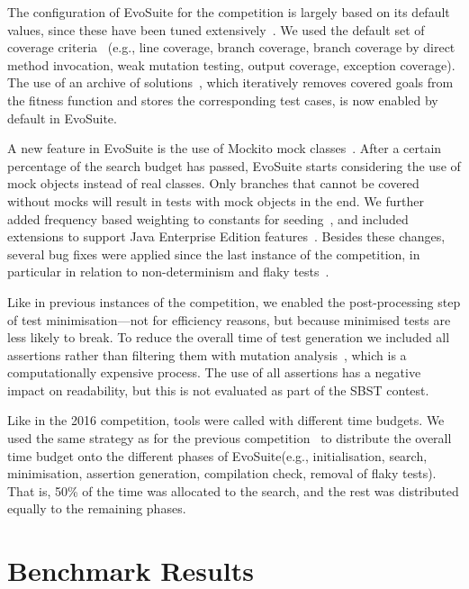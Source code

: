 \documentclass[10pt,conference]{IEEEtran}
\newcommand{\EVOSUITE}{{\sc EvoSuite}\xspace}
\begin{document}
The configuration of \EVOSUITE for the competition is largely based on
its default values, since these have been tuned
extensively~\cite{arcuri2013parameter}. We used the default set of
coverage criteria~\cite{rojas2015combining} (e.g., line coverage,
branch coverage, branch coverage by direct method invocation, weak
mutation testing, output coverage, exception coverage). The use of an
archive of solutions~\cite{emse_archive}, which iteratively removes
covered goals from the fitness function and stores the corresponding
test cases, is now enabled by default in \EVOSUITE.

A new feature in \EVOSUITE is the use of Mockito mock
classes~\cite{ICST_Mocking17}. After a certain percentage of the
search budget has passed, \EVOSUITE starts considering the use of mock
objects instead of real classes. Only branches that cannot be covered
without mocks will result in tests with mock objects in the end. We
further added frequency based weighting to constants for
seeding~\cite{sakti2015instance}, and included extensions to support
Java Enterprise Edition features~\cite{arcuri2016java}. Besides these
changes, several bug fixes were applied since the last instance of the
competition, in particular in relation to non-determinism and flaky
tests~\cite{arcuri2014automated}.

Like in previous instances of the competition, we enabled the
post-processing step of test minimisation---not for efficiency
reasons, but because minimised tests are less likely to break. To
reduce the overall time of test generation we included all assertions
rather than filtering them with mutation
analysis~\cite{10.1109/TSE.2011.93}, which is a computationally
expensive process. The use of all assertions has a negative impact on
readability, but this is not evaluated as part of the SBST contest.

Like in the 2016 competition, tools were called with different time
budgets. We used the same strategy as for the previous
competition~\cite{evosuiteAtSbst2016} to distribute the overall time
budget onto the different phases of \EVOSUITE (e.g., initialisation,
search, minimisation, assertion generation, compilation check, removal
of flaky tests). That is, 50\% of the time was allocated to the
search, and the rest was distributed equally to the remaining
phases.


\section{Benchmark Results}
\end{document}
